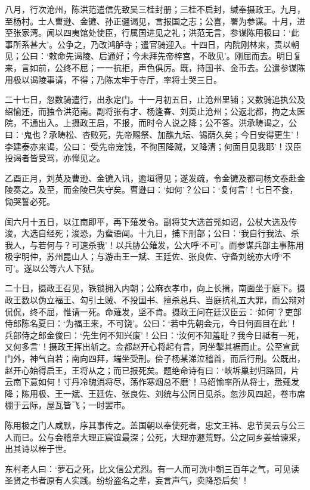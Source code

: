 \documentclass[]{article}
\begin{document}
八月，行次沧州，陈洪范遣信先致吴三桂封册；三桂不启封，缄奉摄政王。九月，至杨村。士人曹逊、金镳、孙正疆谒见，言报国之志；公喜，署为参谋。十月，进至张家湾。闻以四夷馆处使臣，行属国进见之礼；洪范无言，参谋陈用极曰：`此事所系甚大'。公争之，乃改鸿胪寺；遣官骑迎入。十四日，内院刚林来，责以朝见；公曰：`敕命先谒陵、后通好；今未拜先帝梓宫，不敢见'。刚屈而去。明日复来，言如前，公终不屈；一一抗拒，声色俱厉。既，持国书、金币去。公遣参谋陈用极以谒陵事请，不得；乃陈太牢于寺厅，率将士哭三日。

二十七日，忽数骑遣行，出永定门。十一月初五日，止沧州里铺；又数骑追执公及绍愉还，而独令洪范南。副将张有才、杨逢春、刘英止沧州；公返北都，拘之太医院，不通出入。上摄政王启，不报，而时令人说之降；公不答。洪承畴谒之，公曰：`鬼也？承畴松、杏败死，先帝赐祭、加醮九坛、锡荫久矣；今日安得更生'！李建泰亦来谒，公曰：`受先帝宠饯，不徇国降贼，又降清；何面目见我耶'！汉臣投谒者皆受骂，亦惮见之。

乙酉正月，刘英及曹逊、金镳入讯，逾垣得见；遂发疏，令金镳及都司杨文泰赴金陵奏之。及至，而金陵已失守矣。曹逊曰：`如何'？公曰：`复何言'！七日不食，恸哭誓必死。

闰六月十五日，以江南即平，再下薙发令。副将艾大选首髡如诏，公杖大选及传浚，大选自经死；浚恐，为蜚语闻。十九日，捕下刑部；公曰：`我自行我法、杀我人，与若何与？可速杀我'！以兵胁公薙发，公大呼`不可'。而参谋兵部主事陈用极字明仲，苏州昆山人；与游击王一斌、王廷佐、张良佐、守备刘统亦大呼`不可'。遂以公等六人下狱。

二十日，摄政王召见，铁锁拥入内朝；公麻衣孝巾，向上长揖，南面坐于庭下。摄政王数以伪立福王、勾引土贼、不投国书、擅杀总兵、当庭抗礼五大罪，而公辩对侃侃，终不屈，惟请一死。命薙发，坚不肯。摄政王问在廷汉臣云：`如何'？吏部侍郎陈名夏曰：`为福王来，不可饶'。公曰：`若中先朝会元，今日何面目在此'！兵部侍之郎金俊曰：`先生何不知兴废'！公曰：`汝何不知羞耻？我今日祗有一死，又何多言'！摄政王挥出斩之。佥都赵开心将起有言，同坐掣其裾而止。公至宣武门外，神气自若；南向四拜，端坐受刑。侩子杨某涕泣稽首，而后行刑。公既出，赵开心始得启王，王将从之；而已报死矣。题绝命诗有曰：`峡坼巢封归路回，片云南下意如何！寸丹冷魄消将尽，荡作寒烟总不磨'！马绍愉率所从将士，悉薙发降；陈用极、王一斌、王廷佐、张良佐、刘统与公同日见杀。忽沙风四起，卷市席棚于云际，屋瓦皆飞；一时罢市。

陈用极之门人咸默，序其事传之。盖国朝以奉使死者，忠文王袆、忠节吴云与公三人而已。公与会稽章大理正宸谊最深；公死，大理亦遯荒野。公之同乡姜给谏采，出其诗以梓于世。

东村老人曰：`萝石之死，比文信公尤烈。有一人而可洗中朝三百年之气，可见读圣贤之书者原有人实践。纷纷盗名之辈，妄言声气，卖降恐后矣'！
\end{document}
